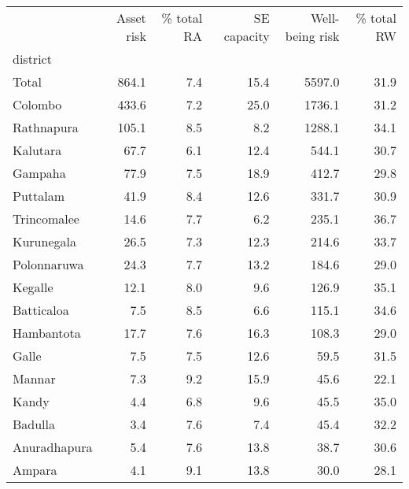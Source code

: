 \begin{tabular}{lrrrrr}
\toprule
{} &  Asset risk &  \% total RA &  SE capacity &  Well-being risk &  \% total RW \\
district     &             &             &              &                  &             \\
\midrule
Total        &       864.1 &         7.4 &         15.4 &           5597.0 &        31.9 \\
Colombo      &       433.6 &         7.2 &         25.0 &           1736.1 &        31.2 \\
Rathnapura   &       105.1 &         8.5 &          8.2 &           1288.1 &        34.1 \\
Kalutara     &        67.7 &         6.1 &         12.4 &            544.1 &        30.7 \\
Gampaha      &        77.9 &         7.5 &         18.9 &            412.7 &        29.8 \\
Puttalam     &        41.9 &         8.4 &         12.6 &            331.7 &        30.9 \\
Trincomalee  &        14.6 &         7.7 &          6.2 &            235.1 &        36.7 \\
Kurunegala   &        26.5 &         7.3 &         12.3 &            214.6 &        33.7 \\
Polonnaruwa  &        24.3 &         7.7 &         13.2 &            184.6 &        29.0 \\
Kegalle      &        12.1 &         8.0 &          9.6 &            126.9 &        35.1 \\
Batticaloa   &         7.5 &         8.5 &          6.6 &            115.1 &        34.6 \\
Hambantota   &        17.7 &         7.6 &         16.3 &            108.3 &        29.0 \\
Galle        &         7.5 &         7.5 &         12.6 &             59.5 &        31.5 \\
Mannar       &         7.3 &         9.2 &         15.9 &             45.6 &        22.1 \\
Kandy        &         4.4 &         6.8 &          9.6 &             45.5 &        35.0 \\
Badulla      &         3.4 &         7.6 &          7.4 &             45.4 &        32.2 \\
Anuradhapura &         5.4 &         7.6 &         13.8 &             38.7 &        30.6 \\
Ampara       &         4.1 &         9.1 &         13.8 &             30.0 &        28.1 \\

\end{tabular}
